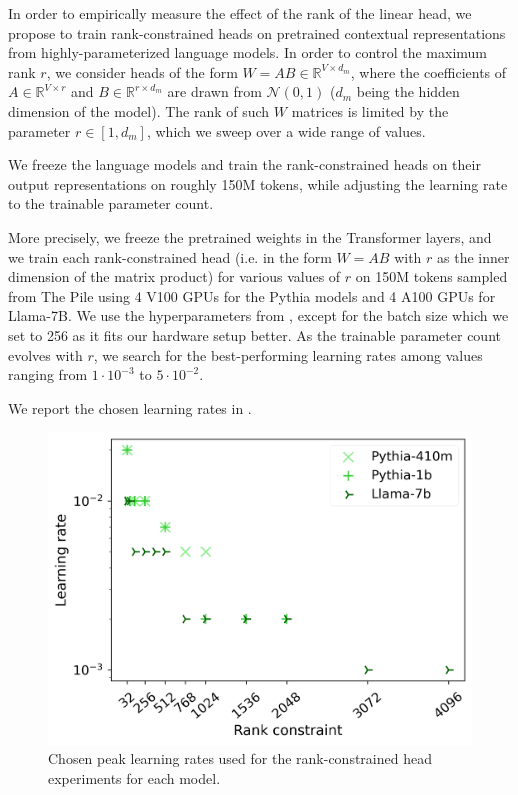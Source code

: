 In order to empirically measure the effect of the rank of the linear head, we propose to train rank-constrained heads on pretrained contextual representations from highly-parameterized language models. In order to control the maximum rank $r$, we consider heads of the form $W = AB \in \mathbb{R}^{V \times d_m}$, where the coefficients of $A \in \mathbb{R}^{V \times r}$ and $B \in \mathbb{R}^{r \times d_m}$ are drawn from $\mathcal{N}(0, 1)$ ($d_m$ being the hidden dimension of the model). The rank of such $W$ matrices is limited by the parameter $r \in [1, d_m]$, which we sweep over a wide range of values.

We freeze the language models and train the rank-constrained heads on their output representations on roughly 150M tokens, while adjusting the learning rate to the trainable parameter count.

More precisely, we freeze the pretrained weights in the Transformer layers, and we train each rank-constrained head (i.e. in the form $W=AB$ with $r$ as the inner dimension of the matrix product) for various values of $r$ on 150M tokens sampled from The Pile using 4 V100 GPUs for the Pythia models and 4 A100 GPUs for Llama-7B. We use the hyperparameters from \citet{biderman2023pythia}, except for the batch size which we set to 256 as it fits our hardware setup better. As the trainable parameter count evolves with $r$, we search for the best-performing learning rates among values ranging from $1\cdot 10^{-3}$ to $5\cdot 10^{-2}$.

We report the chosen learning rates in .

\begin{figure}[h]
\centering
    \includegraphics[width=0.45\linewidth]{sources/part_1/softmax_bottleneck/imgs/lr_final.png}
    \caption{Chosen peak learning rates used for the rank-constrained head experiments for each model.}
    \label{fig:lr_choices}
\end{figure}


